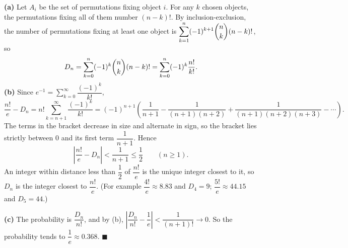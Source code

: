 \textbf{(a)} Let $A_i$ be the set of permutations fixing object $i$. For any $k$ chosen objects, the permutations fixing all of them number $(n-k)!$. By inclusion-exclusion, the number of permutations fixing at least one object is $\displaystyle\sum_{k=1}^n(-1)^{k+1}\dbinom nk(n-k)!$, so
\[
D_n=\sum_{k=0}^n(-1)^k\dbinom nk(n-k)!=\sum_{k=0}^n(-1)^k\dfrac{n!}{k!}.
\]
\textbf{(b)} Since $e^{-1}=\displaystyle\sum_{k=0}^\infty\dfrac{(-1)^k}{k!}$,
\[
\dfrac{n!}{e}-D_n=n!\sum_{k=n+1}^{\infty}\dfrac{(-1)^k}{k!}=(-1)^{n+1}\left(\dfrac{1}{n+1}-\dfrac{1}{(n+1)(n+2)}+\dfrac{1}{(n+1)(n+2)(n+3)}-\cdots\right).
\]
The terms in the bracket decrease in size and alternate in sign, so the bracket lies strictly between $0$ and its first term $\dfrac{1}{n+1}$. Hence
\[
\left|\dfrac{n!}{e}-D_n\right|<\dfrac{1}{n+1}\le\dfrac{1}{2}\qquad(n\ge1).
\]
An integer within distance less than $\dfrac{1}{2}$ of $\dfrac{n!}{e}$ is the unique integer closest to it, so $D_n$ is the integer closest to $\dfrac{n!}{e}$. (For example $\dfrac{4!}{e}\approx8.83$ and $D_4=9$; $\dfrac{5!}{e}\approx44.15$ and $D_5=44$.)

\textbf{(c)} The probability is $\dfrac{D_n}{n!}$, and by (b), $\left|\dfrac{D_n}{n!}-\dfrac{1}{e}\right|<\dfrac{1}{(n+1)!}\to0$. So the probability tends to $\dfrac{1}{e}\approx0.368$. $\blacksquare$
